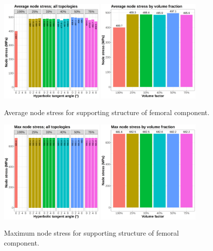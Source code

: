 \documentclass[../main.tex]{subfiles}
\begin{document}
\begin{figure}[h!]
  \centering
  \includegraphics[width=0.45\textwidth]{images/results/plots/femoral/stress/average_stress.png}
  \hfill
  \includegraphics[width=0.45\textwidth]{images/results/plots/femoral/stress/femoral_average_group_stress.png}
  \caption{Average node stress for supporting structure of femoral component.}
  \label{fig:average_stresses}
\end{figure}

\begin{figure}[h!]
  \centering
  \includegraphics[width=0.45\textwidth]{images/results/plots/femoral/stress/maximum_stress.png}
  \hfill
  \includegraphics[width=0.45\textwidth]{images/results/plots/femoral/stress/femoral_max_group_stress.png}
  \caption{Maximum node stress for supporting structure of femoral component.}
  \label{fig:maximum_stresses}
\end{figure}
\end{document}

